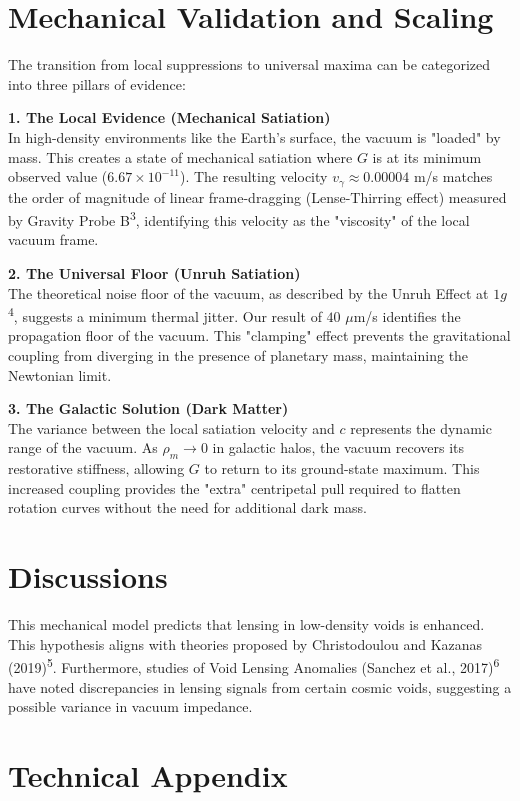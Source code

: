 \documentclass[12pt,a4paper]{article}
\begin{document}
\section{Mechanical Validation and Scaling}
The transition from local suppressions to universal maxima can be categorized into three pillars of evidence:

\textbf{1. The Local Evidence (Mechanical Satiation)} \\
In high-density environments like the Earth's surface, the vacuum is "loaded" by mass. This creates a state of mechanical satiation where $G$ is at its minimum observed value ($6.67 \times 10^{-11}$). The resulting velocity $v_{\gamma} \approx 0.00004$ m/s matches the order of magnitude of linear frame-dragging (Lense-Thirring effect) measured by Gravity Probe B\textsuperscript{3}, identifying this velocity as the "viscosity" of the local vacuum frame.


\textbf{2. The Universal Floor (Unruh Satiation)} \\
The theoretical noise floor of the vacuum, as described by the Unruh Effect at $1g$\textsuperscript{4}, suggests a minimum thermal jitter. Our result of $40$ $\mu$m/s identifies the propagation floor of the vacuum. This "clamping" effect prevents the gravitational coupling from diverging in the presence of planetary mass, maintaining the Newtonian limit.


\textbf{3. The Galactic Solution (Dark Matter)} \\
The variance between the local satiation velocity and $c$ represents the dynamic range of the vacuum. As $\rho_m \to 0$ in galactic halos, the vacuum recovers its restorative stiffness, allowing $G$ to return to its ground-state maximum. This increased coupling provides the "extra" centripetal pull required to flatten rotation curves without the need for additional dark mass.


\section{Discussions}
This mechanical model predicts that lensing in low-density voids is enhanced. This hypothesis aligns with theories proposed by Christodoulou and Kazanas (2019)\textsuperscript{5}. Furthermore, studies of Void Lensing Anomalies (Sanchez et al., 2017)\textsuperscript{6} have noted discrepancies in lensing signals from certain cosmic voids, suggesting a possible variance in vacuum impedance.

\newpage
\appendix
\section{Technical Appendix}
\end{document}
